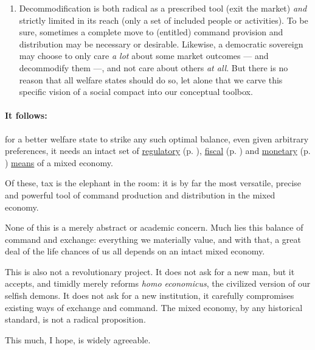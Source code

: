 \begin{description}
\begin{enumerate}
		\item Decommodification is both radical as a prescribed tool (exit the market) \emph{and} strictly limited in its reach (only a set of included people or activities). To be sure, sometimes a complete move to (entitled) command provision and distribution may be necessary or desirable. Likewise, a democratic sovereign may choose to only care \emph{a lot} about some market outcomes --- and decommodify them ---, and not care about others \emph{at all}. But there is no reason that all welfare states should do so, let alone that we carve this specific vision of a social compact into our conceptual toolbox.
	\end{enumerate}
\end{description} 

\paragraph{It follows:} for a better welfare state to strike any such optimal balance, even given arbitrary preferences, it needs an intact set of \hyperref[sec:regulatory]{regulatory} (p. \pageref{sec:regulatory}), \hyperref[sec:fiscal] {fiscal} (p. \pageref{sec:fiscal}) and \hyperref[sec:monetary]{monetary} (p. \pageref{sec:monetary}) \hyperref[sec:means]{means} of a mixed economy. %

Of these, tax is the elephant in the room: it is by far the most versatile, precise and powerful tool of command production and distribution in the mixed economy.

None of this is a merely abstract or academic concern. Much lies this balance of command and exchange: everything we materially value, and with that, a great deal of the life chances of us all depends on an intact mixed economy.

This is also not a revolutionary project. It does not ask for a new man, but it accepts, and timidly merely reforms \emph{homo economicus}, the civilized version of our selfish demons. It does not ask for a new institution, it carefully compromises existing ways of exchange and command. The mixed economy, by any historical standard, is not a radical proposition. 

This much, I hope, is widely agreeable.